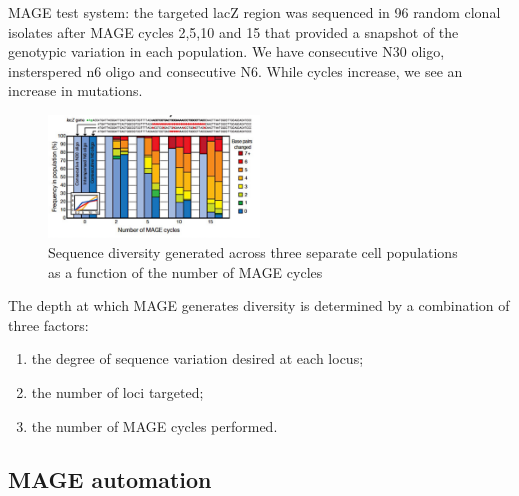 MAGE test system: the targeted lacZ region was sequenced in 96 random clonal isolates after MAGE cycles 2,5,10 and 15 that provided a snapshot of the genotypic variation in each population.   
We have consecutive N30 oligo, insterspered n6 oligo and consecutive N6.  While cycles increase, we see an increase in mutations.
\begin{figure}
\includegraphics[width=0.5\textwidth, center ]{mage_test}
\caption{\label{fig:mage_test} Sequence diversity generated across three separate cell populations as a function of the number of MAGE cycles}
\end{figure}
\noindent
The depth at which MAGE generates diversity is determined by a combination of three factors: 
\begin{enumerate}
	\item the degree of sequence variation desired at each locus; 
	\item the number of loci targeted; 
	\item the number of MAGE cycles performed. 
\end{enumerate}
\noindent
\subsection{MAGE automation}

